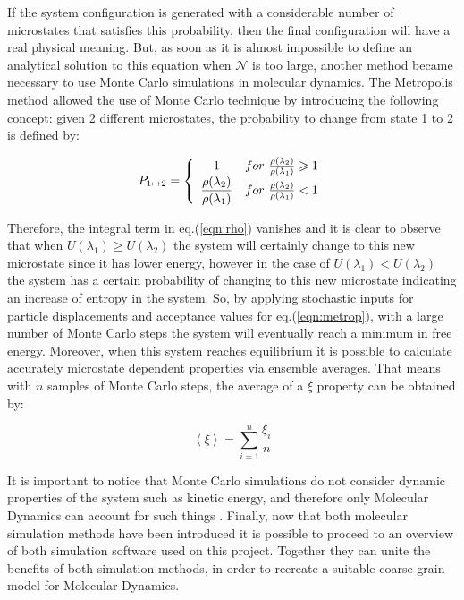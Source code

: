 \documentclass[10pt,a4paper,twoside]{article}
\begin{document}
If the system configuration is generated with a considerable number of microstates that satisfies this probability, then the final configuration will have a real physical meaning. But, as soon as it is almost impossible to define an analytical solution to this equation when $\mathcal{N}$ is too large, another method became necessary to use Monte Carlo simulations in molecular dynamics. The Metropolis method \cite{metropolis} allowed the use of Monte Carlo technique by introducing the following concept: given 2 different microstates, the probability to change from state 1 to 2 is defined by:

\begin{equation}
 P_{1\mapsto2} = \left\{
\begin{array}{c l}     
    1 & for \ \frac{\rho(\lambda_2)}{\rho(\lambda_1)}\geqslant1\\
    \dfrac{\rho(\lambda_2)}{\rho(\lambda_1)} & for \ \frac{\rho(\lambda_2)}{\rho(\lambda_1)}<1
\end{array}\right.
\label{eqn:metrop}
\end{equation}

 Therefore, the integral term in eq.(\ref{eqn:rho}) vanishes and it is clear to observe that when $U(\lambda_1) \geqslant U(\lambda_2)$ the system will certainly change to this new microstate since it has lower energy, however in the case of $U(\lambda_1) < U(\lambda_2)$ the system has a certain probability of changing to this new microstate indicating an increase of entropy in the system. So, by applying stochastic inputs for particle displacements and acceptance values for eq.(\ref{eqn:metrop}), with a large number of Monte Carlo steps the system will eventually reach a minimum in free energy.
  Moreover, when this system reaches equilibrium it is possible to calculate accurately microstate dependent properties via ensemble averages. That means with $n$ samples of Monte Carlo steps, the average of a $ \xi $ property can be obtained by:
 
 \begin{equation}
\left\langle \xi\right\rangle  = \displaystyle \sum_{i=1}^{n} \dfrac{\xi_i}{n}
\label{eqn:average}
\end{equation}

It is important to notice that Monte Carlo simulations do not consider dynamic properties of the system such as kinetic energy, and therefore only Molecular Dynamics can account for such things \cite{satoh}. Finally, now that both molecular simulation methods have been introduced it is possible to proceed to an overview of both simulation software used on this project. Together they can unite the benefits of both simulation methods, in order to recreate a suitable coarse-grain model for Molecular Dynamics.
\end{document}

